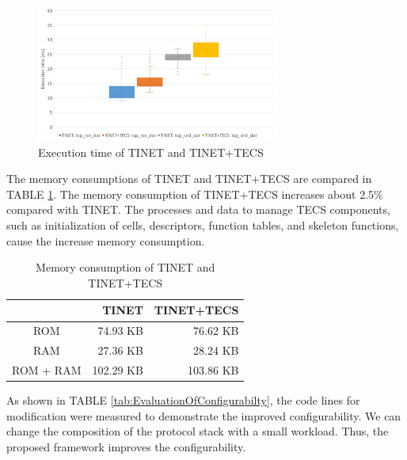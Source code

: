 \documentclass[conference]{IEEEtran/IEEEtran}
\begin{document}
\begin{figure}[t]
    \centering
    \includegraphics[width=8.0cm,clip]{figure/EvaluationOfExecutionTime.pdf}
    \caption{Execution time of TINET and TINET+TECS}
    \label{fig:EvaluationOfExecutionTime}
\end{figure}

The memory consumptions of TINET and TINET+TECS are compared in TABLE \ref{tab:EvaluationOfMemoryConsumption}.
The memory consumption of TINET+TECS increases about 2.5\% compared with TINET.
The processes and data to manage TECS components, such as initialization of cells, descriptors, function tables, and skeleton functions, cause the increase memory consumption.

\begin{table}[t]
    \centering
    \caption{Memory consumption of TINET and TINET+TECS}
    \begin{tabular}{c|r|r}
        \hline\hline
                  &   TINET      &   TINET+TECS  \\ \hline
        ROM       &   74.93 KB   &   76.62 KB   \\
        RAM       &   27.36 KB   &   28.24 KB   \\
        ROM + RAM &   102.29 KB  &   103.86 KB   \\
        \hline
    \end{tabular}
    \label{tab:EvaluationOfMemoryConsumption}
\end{table}

As shown in TABLE \ref{tab:EvaluationOfConfigurabilty}, the code lines for modification were measured to demonstrate the improved configurability.
We can change the composition of the protocol stack with a small workload.
Thus, the proposed framework improves the configurability.
\end{document}
